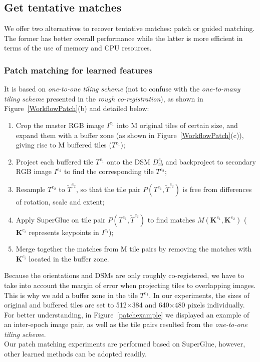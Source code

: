 \subsection{Get tentative matches}\label{patch matching}
We offer two alternatives to recover tentative matches: patch or guided matching. {The former has better overall} performance while the latter is more efficient in terms of the use of memory and CPU resources.\\
\subsubsection{Patch matching for learned features}
{{It} is based on \textit{one-to-one tiling scheme}} {(not to confuse with the \textit{one-to-many tiling scheme} presented in the \textit{rough co-registration}), as shown in Figure~\ref{WorkflowPatch}(b) and detailed below}:
\begin{enumerate}
	\item Crop the master RGB image $I^{e_1}$ into M original tiles of certain size, and expand them with a buffer zone (as shown in Figure~\ref{WorkflowPatch}(c)), giving rise to M buffered tiles ($T^{e_1}$);
	\item Project each buffered tile $T^{e_1}$ onto the DSM $D_{co}^{e_1}$ and backproject to secondary RGB image $I^{e_2}$ to find the corresponding tile $T^{e_2}$;
	\item Resample $T^{e_2}$ to $\widetilde{T}^{e_2}$, so that the tile pair $P({T^{e_1},\widetilde{T}^{e_2}})$ is free from differences of rotation, scale and extent;
	\item Apply SuperGlue on tile pair $P({T^{e_1},\widetilde{T}^{e_2}})$ to find matches $M({\mathbf{K}^{e_1},\mathbf{K}^{e_2}})$ ($\mathbf{K}^{e_i}$ represents keypoints in $I^{e_i}$);
	\item Merge together the matches from M tile pairs by removing the matches with $\mathbf{K}^{e_i}$ located in the buffer zone.\\
\end{enumerate}

Because the orientations and DSMs are only roughly co-registered, we have to take into account the margin of error when projecting tiles to overlapping images. This is why we add a buffer zone in the tile $T^{e_1}$. In our experiments, the sizes of original and buffered tiles are set to 512$\times$384 and 640$\times$480 pixels individually.\\
For better understanding, in Figure~\ref{patchexample} we displayed an example of an inter-epoch image pair, as well as the tile pairs resulted from the \textit{one-to-one tiling scheme}.\\
Our patch matching experiments are performed based on SuperGlue, however, other learned methods can be adopted readily. \\

